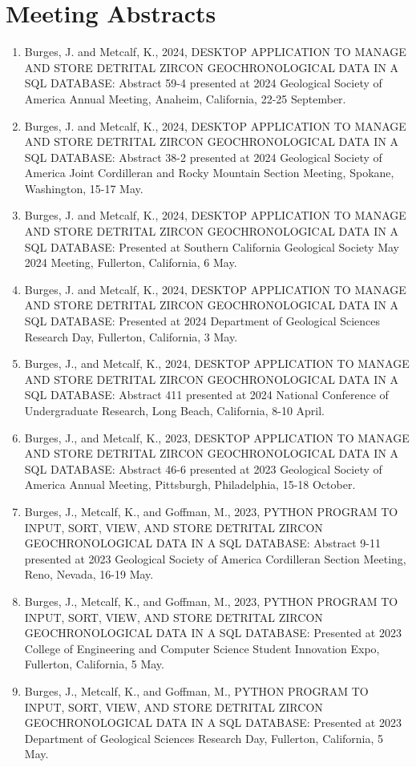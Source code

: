 \section{Meeting Abstracts}
\begin{enumerate}[9.]
\item Burges, J. and Metcalf, K., 2024, DESKTOP APPLICATION TO MANAGE AND STORE DETRITAL ZIRCON GEOCHRONOLOGICAL DATA IN A SQL DATABASE: Abstract 59-4 presented at 2024 Geological Society of America Annual Meeting, Anaheim, California, 22-25 September.
\item Burges, J. and Metcalf, K., 2024, DESKTOP APPLICATION TO MANAGE AND STORE DETRITAL ZIRCON GEOCHRONOLOGICAL DATA IN A SQL DATABASE: Abstract 38-2 presented at 2024 Geological Society of America Joint Cordilleran and Rocky Mountain Section Meeting, Spokane, Washington, 15-17 May.
\item Burges, J. and Metcalf, K., 2024, DESKTOP APPLICATION TO MANAGE AND STORE DETRITAL ZIRCON GEOCHRONOLOGICAL DATA IN A SQL DATABASE: Presented at Southern California Geological Society May 2024 Meeting, Fullerton, California, 6 May.
\item Burges, J. and Metcalf, K., 2024, DESKTOP APPLICATION TO MANAGE AND STORE DETRITAL ZIRCON GEOCHRONOLOGICAL DATA IN A SQL DATABASE: Presented at 2024 Department of Geological Sciences Research Day, Fullerton, California, 3 May.
\item Burges, J., and Metcalf, K., 2024, DESKTOP APPLICATION TO MANAGE AND STORE DETRITAL ZIRCON GEOCHRONOLOGICAL DATA IN A SQL DATABASE: Abstract 411 presented at 2024 National Conference of Undergraduate Research, Long Beach, California, 8-10 April.
\item Burges, J., and Metcalf, K., 2023, DESKTOP APPLICATION TO MANAGE AND STORE DETRITAL ZIRCON GEOCHRONOLOGICAL DATA IN A SQL DATABASE: Abstract 46-6 presented at 2023 Geological Society of America Annual Meeting, Pittsburgh, Philadelphia, 15-18 October.
\item Burges, J., Metcalf, K., and Goffman, M., 2023, PYTHON PROGRAM TO INPUT, SORT, VIEW, AND STORE DETRITAL ZIRCON GEOCHRONOLOGICAL DATA IN A SQL DATABASE: Abstract 9-11 presented at 2023 Geological Society of America Cordilleran Section Meeting, Reno, Nevada, 16-19 May.
\item Burges, J., Metcalf, K., and Goffman, M., 2023, PYTHON PROGRAM TO INPUT, SORT, VIEW, AND STORE DETRITAL ZIRCON GEOCHRONOLOGICAL DATA IN A SQL DATABASE: Presented at 2023 College of Engineering and Computer Science Student Innovation Expo, Fullerton, California, 5 May.
\item Burges, J., Metcalf, K., and Goffman, M., PYTHON PROGRAM TO INPUT, SORT, VIEW, AND STORE DETRITAL ZIRCON GEOCHRONOLOGICAL DATA IN A SQL DATABASE: Presented at 2023 Department of Geological Sciences Research Day, Fullerton, California, 5 May.
\end{enumerate}

